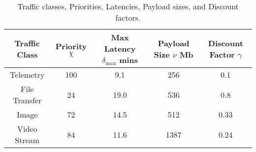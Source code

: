 \documentclass{article}
\begin{document}
\begin{table*} [tb]
	\centering
    \scriptsize
	\begin{tabular}{|c|c|c|c|c|}
		\hline
		\textbf{Traffic Class} & \textbf{Priority} $\chi$ & \textbf{Max Latency} $\delta_{\mathrm{max}}$ mins & \textbf{Payload Size} $\nu$ Mb & \textbf{Discount Factor} $\gamma$\\
		\hline
		Telemetry & 100 & 9.1 & 256 & 0.1\\
		\hline
		File Transfer & 24 & 19.0 & 536 & 0.8\\
		\hline
		Image & 72 & 14.5 & 512 & 0.33\\
		\hline
		Video Stream & 84 & 11.6 & 1387 & 0.24\\
		\hline
	\end{tabular}
    \vspace{-3mm}
	\caption{\scriptsize{Traffic classes, Priorities, Latencies, Payload sizes, and Discount factors.}}
    \vspace{3mm}
	\label{T1}
\end{table*}
\end{document}
